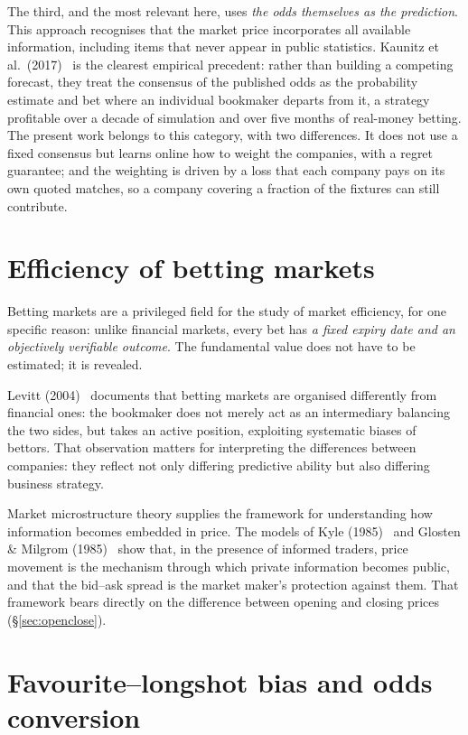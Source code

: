 \documentclass[12pt,a4paper,oneside]{report}
\renewcommand{\_}{\oldunderscore\allowbreak}
\theoremstyle{definition}
\theoremstyle{plain}
\theoremstyle{definition}   %
\begin{document}
The third, and the most relevant here, uses \emph{the odds themselves as the prediction}. This
approach recognises that the market price incorporates all available information, including
items that never appear in public statistics. Kaunitz et al.\ (2017)~\cite{kaunitz2017} is the clearest empirical
precedent: rather than building a competing forecast, they treat the consensus of the published
odds as the probability estimate and bet where an individual bookmaker departs from it, a
strategy profitable over a decade of simulation and over five months of real-money betting. The
present work belongs to this category, with two differences. It does not use a fixed consensus
but learns online how to weight the companies, with a regret guarantee; and the weighting is
driven by a loss that each company pays on its own quoted matches, so a company covering a
fraction of the fixtures can still contribute.

\section{Efficiency of betting markets}

Betting markets are a privileged field for the study of market efficiency, for one specific
reason: unlike financial markets, every bet has \emph{a fixed expiry date and an objectively
verifiable outcome}. The fundamental value does not have to be estimated; it is revealed.

Levitt (2004)~\cite{levitt2004} documents that betting markets are organised differently from financial ones:
the bookmaker does not merely act as an intermediary balancing the two sides, but takes an
active position, exploiting systematic biases of bettors. That observation matters for
interpreting the differences between companies: they reflect not only differing predictive
ability but also differing business strategy.

Market microstructure theory supplies the framework for understanding how information becomes
embedded in price. The models of Kyle (1985)~\cite{kyle1985} and Glosten \& Milgrom (1985)~\cite{glosten1985} show that, in the
presence of informed traders, price movement is the mechanism through which private
information becomes public, and that the bid--ask spread is the market maker's
protection against them. That framework bears directly on the difference between opening and
closing prices (\S\ref{sec:openclose}).

\section{Favourite--longshot bias and odds conversion}
\end{document}
